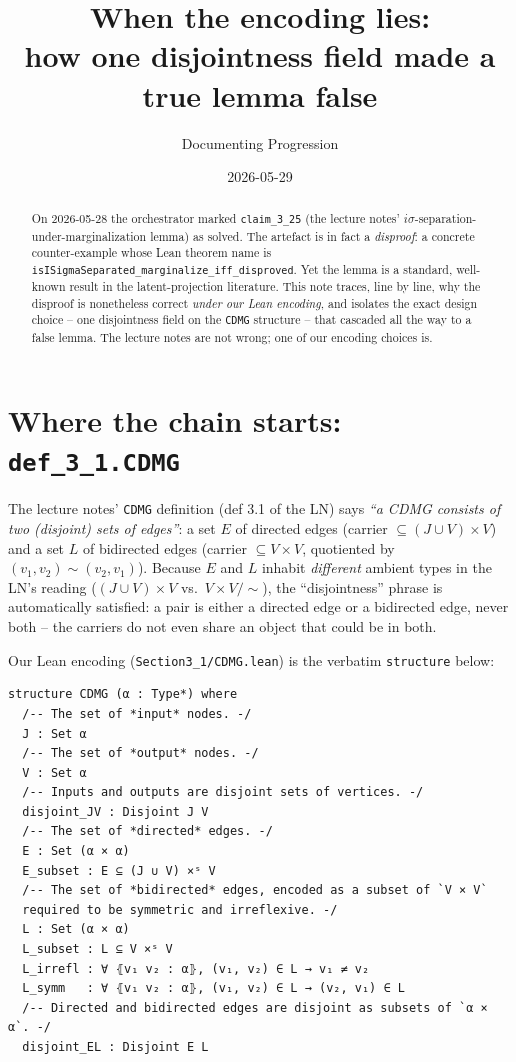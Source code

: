 \documentclass[11pt,a4paper]{article}
\title{When the encoding lies:\\
how one disjointness field made a true lemma false}
\author{Documenting Progression}
\date{2026-05-29}
\begin{document}
\maketitle

\begin{abstract}
On 2026-05-28 the orchestrator marked \texttt{claim\_3\_25} (the
lecture notes' $i\sigma$-separation-under-marginalization lemma) as
solved. The artefact is in fact a \emph{disproof}: a concrete
counter-example whose Lean theorem name is
\texttt{isISigmaSeparated\_marginalize\_iff\_disproved}. Yet the
lemma is a standard, well-known result in the latent-projection
literature. This note traces, line by line, why the disproof is
nonetheless correct \emph{under our Lean encoding}, and isolates the
exact design choice -- one disjointness field on the \texttt{CDMG}
structure -- that cascaded all the way to a false lemma. The lecture
notes are not wrong; one of our encoding choices is.
\end{abstract}

\section{Where the chain starts: \texttt{def\_3\_1.CDMG}}

The lecture notes' \texttt{CDMG} definition (def 3.1 of the LN) says
\textit{``a CDMG consists of two (disjoint) sets of edges''}: a set
$E$ of directed edges (carrier $\subseteq (J \cup V) \times V$) and
a set $L$ of bidirected edges (carrier $\subseteq V \times V$,
quotiented by $(v_1, v_2) \sim (v_2, v_1)$). Because $E$ and $L$
inhabit \emph{different} ambient types in the LN's reading
($(J \cup V) \times V$ vs.\ $V \times V / \!\!\sim$), the
``disjointness'' phrase is automatically satisfied: a pair is either
a directed edge or a bidirected edge, never both -- the carriers do
not even share an object that could be in both.

Our Lean encoding (\texttt{Section3\_1/CDMG.lean}) is the verbatim
\texttt{structure} below:

\begin{lstlisting}
structure CDMG (α : Type*) where
  /-- The set of *input* nodes. -/
  J : Set α
  /-- The set of *output* nodes. -/
  V : Set α
  /-- Inputs and outputs are disjoint sets of vertices. -/
  disjoint_JV : Disjoint J V
  /-- The set of *directed* edges. -/
  E : Set (α × α)
  E_subset : E ⊆ (J ∪ V) ×ˢ V
  /-- The set of *bidirected* edges, encoded as a subset of `V × V`
  required to be symmetric and irreflexive. -/
  L : Set (α × α)
  L_subset : L ⊆ V ×ˢ V
  L_irrefl : ∀ ⦃v₁ v₂ : α⦄, (v₁, v₂) ∈ L → v₁ ≠ v₂
  L_symm   : ∀ ⦃v₁ v₂ : α⦄, (v₁, v₂) ∈ L → (v₂, v₁) ∈ L
  /-- Directed and bidirected edges are disjoint as subsets of `α × α`. -/
  disjoint_EL : Disjoint E L
\end{lstlisting}
\end{document}

